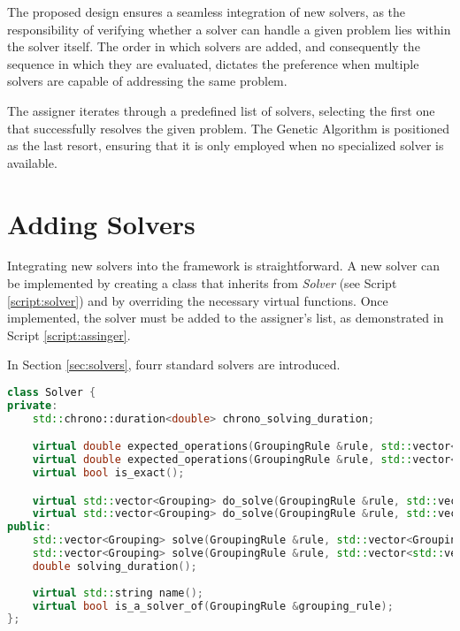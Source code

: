             The proposed design ensures a seamless integration of new solvers, as the responsibility of verifying whether a solver can handle a given problem lies within the solver itself. The order in which solvers are added, and consequently the sequence in which they are evaluated, dictates the preference when multiple solvers are capable of addressing the same problem.

            The assigner iterates through a predefined list of solvers, selecting the first one that successfully resolves the given problem. The Genetic Algorithm is positioned as the last resort, ensuring that it is only employed when no specialized solver is available.

        \section{Adding Solvers}
            Integrating new solvers into the framework is straightforward. A new solver can be implemented by creating a class that inherits from \textit{Solver} (see Script \ref{script:solver}) and by overriding the necessary virtual functions. Once implemented, the solver must be added to the assigner's list, as demonstrated in Script \ref{script:assinger}.

            In Section \ref{sec:solvers}, fourr standard solvers are introduced.

\begin{lstlisting}[language=C++, caption={Solver Class.}, label={script:solver}]
class Solver {
private:
    std::chrono::duration<double> chrono_solving_duration;

    virtual double expected_operations(GroupingRule &rule, std::vector<Grouping> &grouping_intances);
    virtual double expected_operations(GroupingRule &rule, std::vector<std::vector<POrmObject>> &orm_objects_intances);
    virtual bool is_exact();

    virtual std::vector<Grouping> do_solve(GroupingRule &rule, std::vector<Grouping> &grouping_intances);
    virtual std::vector<Grouping> do_solve(GroupingRule &rule, std::vector<std::vector<POrmObject>> &orm_objects_intances);
public:
    std::vector<Grouping> solve(GroupingRule &rule, std::vector<Grouping> &grouping_intances);
    std::vector<Grouping> solve(GroupingRule &rule, std::vector<std::vector<POrmObject>> &orm_objects_intances);
    double solving_duration();
    
    virtual std::string name();
    virtual bool is_a_solver_of(GroupingRule &grouping_rule);
};
    \end{lstlisting}

